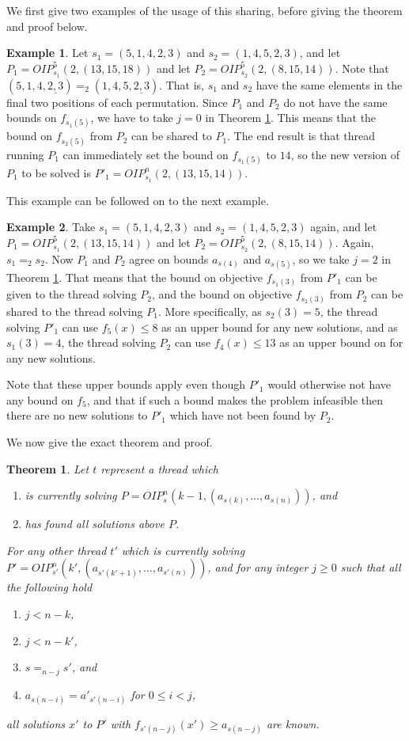 \documentclass{amsart}
\newtheorem{theorem}{Theorem}
\theoremstyle{definition}
\newtheorem{example}{Example}
\begin{document}
We first give two examples of the usage of this sharing, before giving the theorem and proof below.
\begin{example}
  Let $s_1 = (5,1,4,2,3)$ and $s_2 = (1,4,5,2,3)$, and let 
$P_1 = {O\!I\!P}^5_{s_1}(2,(13,15,18))$ and let $P_2 = {O\!I\!P}^5_{s_2}(2, (8,15,14))$.
Note that $(5,1,4,\underline{2,3}) =_2 (1,4,5,\underline{2,3})$. That is, $s_1$ and $s_2$ have the same elements in the final two positions of each permutation.
Since $P_1$ and $P_2$ do not have the same bounds on $f_{s_1(5)}$, we have to take $j=0$ in Theorem \ref{thm:sharing}.
This means that the bound on $f_{s_2(5)}$ from $P_2$ can be shared to $P_1$.
The end result is that thread running $P_1$ can immediately set the bound on $f_{s_1(5)}$ to $14$, so the new version of $P_1$ to be solved is $P'_1 = {O\!I\!P}^n_{s_1}(2,(13,15,14))$.
\end{example}
This example can be followed on to the next example.
\begin{example}
  Take $s_1 = (5,1,4,2,3)$ and $s_2 = (1,4,5,2,3)$ again, and let 
$P_1 = {O\!I\!P}^5_{s_1}(2,(13,15,14))$ and let $P_2 = {O\!I\!P}^5_{s_2}(2, (8,15,14))$.
Again, $s_1 =_2 s_2$.
Now $P_1$ and $P_2$ agree on bounds $a_{s(4)}$ and $a_{s(5)}$, so we take $j=2$ in Theorem \ref{thm:sharing}.
That means that the bound on objective $f_{s_1(3)}$ from $P'_1$ can be given to the thread solving $P_2$, and the bound on objective $f_{s_2(3)}$ from $P_2$ can be shared to the thread solving $P_1$.
More specifically, as $s_2(3) = 5$, the thread solving $P'_1$ can use $f_5(x) \leq 8$ as an upper bound for any new solutions, and as $s_1(3) = 4$, the thread solving $P_2$ can use $f_4(x) \leq 13$ as an upper bound on for any new solutions.

Note that these upper bounds apply even though $P'_1$ would otherwise not have any bound on $f_5$, and that if such a bound makes the problem infeasible then there are no new solutions to $P'_1$ which have not been found by $P_2$.
\end{example}

We now give the exact theorem and proof.
\begin{theorem}\label{thm:sharing}
  Let $t$ represent a thread which
  \begin{enumerate}
    \item is currently solving 
   $P = {O\!I\!P}^n_s(k-1,(a_{s(k)},\dots,a_{s(n)}))$, and
 \item has found all solutions above $P$.
  \end{enumerate}
  For any other thread $t'$ which is currently solving $P' = {O\!I\!P}^n_{s'}(k', (a_{s'(k'+1)},\dots,a_{s'(n)}))$, and for any integer $j \geq 0$ such that all the following hold
  \begin{enumerate}
    \item $j < n-k$,
    \item $j < n-k'$,
    \item $s =_{n-j} s'$, and
    \item $a_{s(n-i)} = a'_{s'(n-i)}$ for $0 \leq i < j$,
  \end{enumerate}
  all solutions $x'$ to $P'$ with $f_{s'(n-j)}(x') \geq a_{s(n-j)}$ are known.
\end{theorem}
\end{document}
